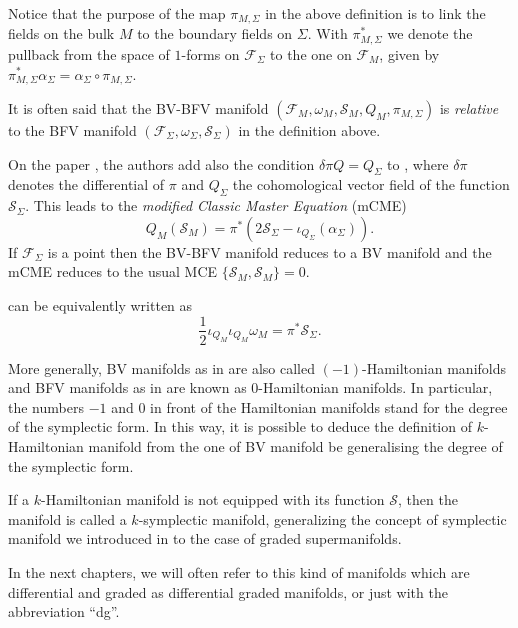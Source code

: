 Notice that the purpose of the map $\pi_{M, \Sigma}$ in the above definition is to link the fields on the bulk $M$ to the boundary fields on $\Sigma$.
With $\pi_{M,\Sigma}^*$ we denote the pullback from the space of $1$-forms on $\mathcal{F}_\Sigma$ to the one on $\mathcal{F}_M$, given by $\pi_{M,\Sigma}^* \alpha_\Sigma = \alpha_\Sigma \circ \pi_{M,\Sigma}$.

It is often said that the BV-BFV manifold $(\mathcal{F}_M, \omega_M, \mathcal{S}_M, Q_M, \pi_{M, \Sigma})$ is \emph{relative} to the BFV manifold $(\mathcal{F}_\Sigma, \omega_\Sigma, \mathcal{S}_\Sigma)$ in the definition above.

On the paper \cite{mCME}, the authors add also the condition $\delta \pi Q = Q_\Sigma$ to , where $\delta \pi$ denotes the differential of $\pi$ and $Q_\Sigma$ the cohomological vector field of the function $\mathcal{S}_\Sigma$.
This leads to the \emph{modified Classic Master Equation} (mCME)
\begin{equation}
\label{eq:mCME}
    Q_M (\mathcal{S}_M) = \pi ^* (2 \mathcal{S}_\Sigma - \iota_{Q_\Sigma}(\alpha_\Sigma)).
\end{equation}
If $\mathcal{F}_\Sigma$ is a point then the BV-BFV manifold reduces to a BV manifold and the mCME reduces to the usual MCE $\{\mathcal{S}_M, \mathcal{S}_M\} = 0$.

 can be equivalently written as
\begin{equation*}
    \frac{1}{2} \iota_{Q_M} \iota_{Q_M} \omega_M =  \pi^* \mathcal{S}_\Sigma .
\end{equation*}

More generally, BV manifolds as in  are also called $(-1)$-Hamiltonian manifolds and BFV manifolds as in  are known as $0$-Hamiltonian manifolds.
In particular, the numbers $-1$ and $0$ in front of the Hamiltonian manifolds stand for the degree of the symplectic form.
In this way, it is possible to deduce the definition of $k$-Hamiltonian manifold from the one of BV manifold be generalising the degree of the symplectic form.

If a $k$-Hamiltonian manifold is not equipped with its function $\mathcal{S}$, then the manifold is called a $k$-symplectic manifold, generalizing the concept of symplectic manifold we introduced in  to the case of graded supermanifolds.

In the next chapters, we will often refer to this kind of manifolds which are differential and graded as differential graded manifolds, or just with the abbreviation “dg”.